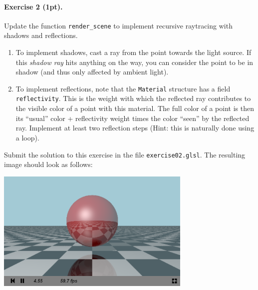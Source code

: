 \documentclass{article}
\newenvironment{exercise}[2]{\paragraph{Exercise #1 (#2pt).} }{
\medskip}
\begin{document}
\begin{exercise}{2}{1}
Update the function \verb#render_scene# to implement recursive raytracing with shadows and reflections.
\begin{enumerate}
\item To implement shadows, cast a ray from the point towards the light source. If this \emph{shadow ray} hits anything on the way, you can consider the point to be in shadow (and thus only affected by ambient light).
\item To implement reflections, note that the \verb#Material# structure has a field \verb#reflectivity#. This is the weight with which the reflected ray contributes to the visible color of a point with this material. The full color of a point is then its ``usual'' color + reflectivity weight times the color ``seen'' by the reflected ray. Implement at least two reflection steps (Hint: this is naturally done using a loop).
\end{enumerate}
Submit the solution to this exercise in the file \verb#exercise02.glsl#.
The resulting image should look as follows:
\begin{center}
\includegraphics[width=0.7\textwidth]{raytracing.png}
\end{center}
\end{exercise}
\end{document}
